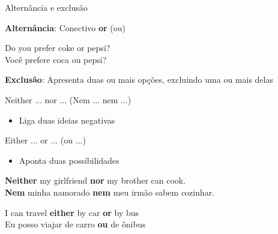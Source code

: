 \documentclass[compress,mathserif,xcolor=table]{beamer}
\begin{document}
\begin{frame}{Alternância e exclusão}

\textbf{Alternância}: Conectivo \textbf{or} (ou)

\vspace{0.15cm}

Do you prefer coke or pepsi? \\
Você prefere coca ou pepsi?

\vspace{0.15cm}

\textbf{Exclusão}: Apresenta duas ou mais opções, excluindo uma ou mais delas

\vspace{0.1cm}

Neither ... nor ... (Nem ... nem ...)
\begin{itemize}
    \item Liga duas ideias negativas
\end{itemize}
Either ... or ... (ou ...)
\begin{itemize}
    \item Aponta duas possibilidades
\end{itemize}

\textbf{Neither} my girlfriend \textbf{nor} my brother can cook. \\
\textbf{Nem} minha namorado \textbf{nem} meu irmão sabem cozinhar. 

I can travel \textbf{either} by car \textbf{or} by bus
 \\
Eu posso viajar de carro \textbf{ou} de ônibus
\end{frame}

\end{document}
